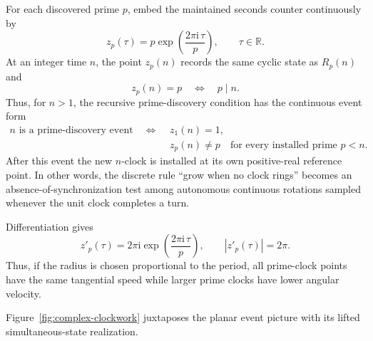 \documentclass[11pt,a4paper]{article}
\theoremstyle{clockplain}
\theoremstyle{definition}
\theoremstyle{remark}
\begin{document}
For each discovered prime $p$, embed the maintained seconds counter continuously by
\begin{equation}
z_p(\tau)=p\exp\!\left(\frac{2\pi\mathrm{i}\,\tau}{p}\right),\qquad \tau\in\mathbb R.
\label{eq:complex-clock}
\end{equation}
At an integer time $n$, the point $z_p(n)$ records the same cyclic state as $R_p(n)$ and
\[
z_p(n)=p\quad\Longleftrightarrow\quad p\mid n.
\]
Thus, for $n>1$, the recursive prime-discovery condition has the continuous event form
\begin{equation}
\begin{aligned}
\text{$n$ is a prime-discovery event}
\quad\Longleftrightarrow\quad & z_1(n)=1,\\
& z_p(n)\ne p\quad\text{for every installed prime }p<n.
\end{aligned}
\label{eq:continuous-prime-event}
\end{equation}
After this event the new $n$-clock is installed at its own positive-real reference point. In other words, the discrete rule ``grow when no clock rings'' becomes an absence-of-synchronization test among autonomous continuous rotations sampled whenever the unit clock completes a turn.

Differentiation gives
\[
z'_p(\tau)=2\pi\mathrm{i}\exp\!\left(\frac{2\pi\mathrm{i}\,\tau}{p}\right),\qquad |z'_p(\tau)|=2\pi.
\]
Thus, if the radius is chosen proportional to the period, all prime-clock points have the same tangential speed while larger prime clocks have lower angular velocity.

Figure~\ref{fig:complex-clockwork} juxtaposes the planar event picture with its lifted simultaneous-state realization.
\end{document}
